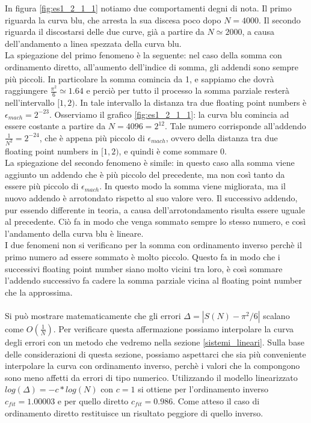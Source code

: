\documentclass[letterpaper, 12pt]{article}
\begin{document}
In figura \ref{fig:es1_2_1_1} notiamo due comportamenti degni di nota. Il primo riguarda
la curva blu, che arresta la sua discesa poco dopo $N = 4000$. 
Il secondo riguarda il discostarsi delle due curve, già a partire da 
$N \simeq 2000$, a causa dell'andamento a linea spezzata della curva blu.\\
La spiegazione del primo fenomeno è la seguente: nel caso della somma con ordinamento
diretto, all'aumento dell'indice di somma, gli addendi sono sempre più piccoli. In
particolare la somma comincia da 1, e sappiamo che dovrà raggiungere $\frac{\pi^2}{6} \simeq 1.64$ e perciò 
per tutto il processo la somma parziale resterà nell'intervallo $[1, 2)$. In tale intervallo la distanza tra due 
floating point numbers è $\epsilon_{mach} = 2^{-23}$. Osserviamo il grafico \ref{fig:es1_2_1_1}: la curva blu comincia ad essere 
costante a partire da $N = 4096 = 2^{12}$. Tale numero corrisponde all'addendo $\frac{1}{N^2} = 2^{-24}$, 
che è appena più piccolo di $\epsilon_{mach}$, ovvero della distanza tra due floating point numbers in $[1, 2)$, e quindi è
come sommare $0$. \\
La spiegazione del secondo fenomeno è simile: in questo caso alla somma viene aggiunto
un addendo che è più piccolo del precedente, ma non così tanto da essere più piccolo di $\epsilon_{mach}$. In
questo modo la somma viene migliorata, ma il nuovo addendo è arrotondato rispetto al suo valore vero. Il successivo
addendo, pur essendo differente in teoria, a causa dell'arrotondamento risulta essere uguale al precedente. Ciò fa
in modo che venga sommato sempre lo stesso numero, e così l'andamento della curva blu è lineare. \\
I due fenomeni non si verificano per la somma con ordinamento inverso perchè il primo numero ad essere sommato 
è molto piccolo. Questo fa in modo che i successivi floating point number siano molto vicini tra loro, è così sommare
l'addendo successivo fa cadere la somma parziale vicina al floating point number che la approssima. \\
\\
Si può mostrare matematicamente che gli errori $\Delta = |S(N)-\pi^2/6|$ scalano come $O(\frac{1}{N})$. Per verificare questa
affermazione possiamo interpolare la curva degli errori con un metodo che vedremo nella sezione \ref{sistemi_lineari}.
Sulla base delle considerazioni di questa sezione, possiamo aspettarci che sia più conveniente interpolare la curva 
con ordinamento inverso, perchè i valori che la compongono sono meno affetti da errori di tipo numerico. Utilizzando 
il modello linearizzato $log(\Delta) = -c*log(N)$ con $c = 1$ si ottiene per l'ordinamento inverso 
$c_{fit} = 1.00003$ e per quello diretto $c_{fit} = 0.986$. Come atteso il caso di ordinamento diretto restituisce un
risultato peggiore di quello inverso.
\end{document}
